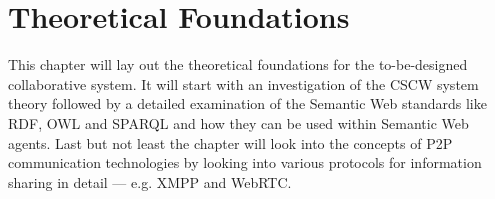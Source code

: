 
\chapter{Theoretical Foundations} %
\label{cha:theoretical_foundations}

This chapter will lay out the theoretical foundations for the to-be-designed collaborative system. It will start with an investigation of the \gls{CSCW} system theory followed by a detailed examination of the Semantic Web standards like \gls{RDF}, \gls{OWL} and \gls{SPARQL} and how they can be used within Semantic Web agents. Last but not least the chapter will look into the concepts of \gls{P2P} communication technologies by looking into various protocols for information sharing in detail --- e.g. \gls{XMPP} and \gls{WebRTC}.









